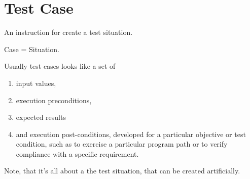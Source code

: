\section{Test Case}
\label{sec:Test Case}

An instruction for create a test situation.

\begin{center}
Case = Situation.
\end{center}

Usually test cases looks like a set of

\begin{enumerate}
\item 
    input values,
\item     execution preconditions,
\item     expected results
\item     and execution post-conditions, developed for a particular objective or test condition, such as to exercise a particular program path or to verify compliance with a specific requirement.
\end{enumerate}

Note, that it's all about a the test situation, that can be created artificially.